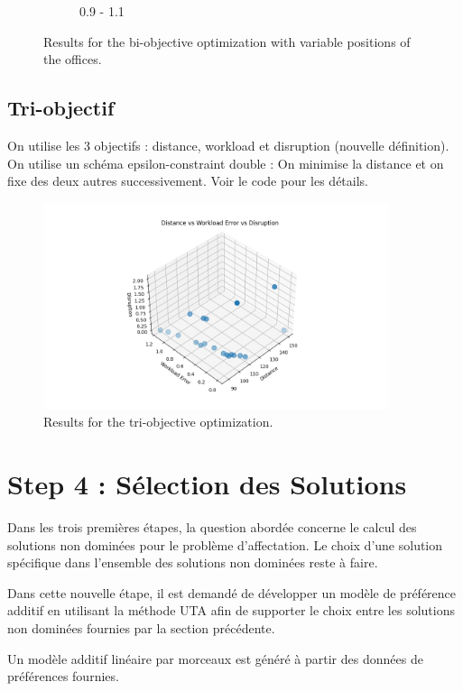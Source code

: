 \documentclass[12pt,a4paper]{article}
\begin{document}
\begin{figure}[H]
\begin{subfigure}{0.32\textwidth}
        \caption{0.9 - 1.1}
        \label{fig:solve3}
    \end{subfigure}
    \caption{Results for the bi-objective optimization with variable positions of the offices.}
    \label{fig:all_solves}
\end{figure}

\subsection*{Tri-objectif}
On utilise les 3 objectifs : distance, workload et disruption (nouvelle définition). On utilise un schéma epsilon-constraint double : On minimise la distance et on fixe des deux autres successivement. Voir le code pour les détails.

\begin{figure}[H]
    \centering
    \includegraphics[width=0.9\textwidth]{figures/solve5.png}
    \caption{Results for the tri-objective optimization.}
    \label{fig:solve2}
\end{figure}


\section*{Step 4 : Sélection des Solutions}

Dans les trois premières étapes, la question abordée concerne le calcul des solutions non dominées pour le problème d'affectation. Le choix d'une solution spécifique dans l'ensemble des solutions non dominées reste à faire. 

Dans cette nouvelle étape, il est demandé de développer un modèle de préférence additif en utilisant la méthode UTA afin de supporter le choix entre les solutions non dominées fournies par la section précédente.

Un modèle additif linéaire par morceaux est généré à partir des données de préférences fournies.
\end{document}
